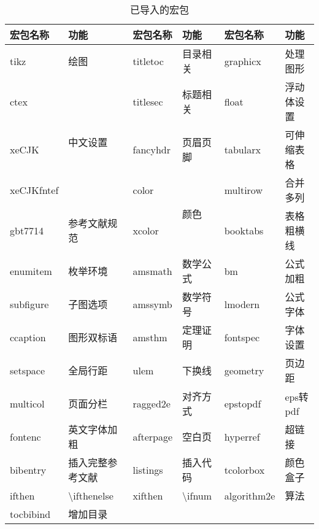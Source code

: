 \begin{table}[H]
    \centering
    \caption{已导入的宏包}
    \label{tab:pkgs}
    \begin{tabular}{llllll}
    \hline
    宏包名称       & 功能                    & 宏包名称      & 功能                  & 宏包名称      & 功能      \\ \hline
    tikz       & 绘图                    & titletoc  & 目录相关                & graphicx  & 处理图形    \\
    ctex       & \multirow{3}{*}{中文设置} & titlesec  & 标题相关                & float     & 浮动体设置   \\
    xeCJK      &                       & fancyhdr  & 页眉页脚                & tabularx  & 可伸缩表格   \\
    xeCJKfntef &                       & color     & \multirow{2}{*}{颜色} & multirow  & 合并多列    \\
    gbt7714    & 参考文献规范                & xcolor    &                     & booktabs  & 表格粗横线   \\
    enumitem   & 枚举环境                  & amsmath   & 数学公式                & bm        & 公式加粗    \\
    subfigure  & 子图选项                  & amssymb   & 数学符号                & lmodern   & 公式字体    \\
    ccaption   & 图形双标语                 & amsthm    & 定理证明                & fontspec  & 字体设置    \\
    setspace   & 全局行距                  & ulem      & 下换线                 & geometry  & 页边距     \\
    multicol   & 页面分栏                  & ragged2e  & 对齐方式                & epstopdf  & eps转pdf \\
    fontenc    & 英文字体加粗                & afterpage & 空白页                 & hyperref  & 超链接     \\
    bibentry   & 插入完整参考文献              & listings  & 插入代码                & tcolorbox & 颜色盒子    \\
    ifthen & \textbackslash{}ifthenelse & xifthen & {}\textbackslash{}ifnum & algorithm2e & 算法 \\ 
    tocbibind & 增加目录 &  & &  &  \\ \hline
    \end{tabular}%
\end{table}

